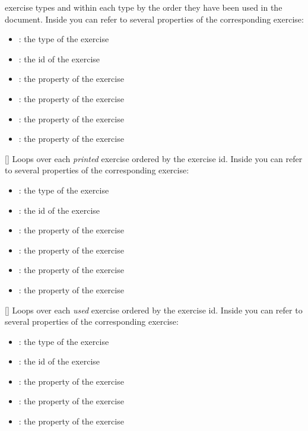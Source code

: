 \documentclass{xsim-manual}
\begin{document}
\begin{commands}
    exercise types and within each type by the order they have been used in
    the document.  Inside  you can refer to several properties of
    the corresponding exercise:
    \begin{itemize}
      \item {}: the type of the exercise
      \item {}: the id of the exercise
      \item {}: the  property of the exercise
      \item {}: the  property of the exercise
      \item {}: the  property of the exercise
      \item {}: the  property of the exercise
    \end{itemize}
  []
    Loops over each \emph{printed} exercise ordered by the exercise id.  Inside
     you can refer to several properties of the corresponding
    exercise:
    \begin{itemize}
      \item {}: the type of the exercise
      \item {}: the id of the exercise
      \item {}: the  property of the exercise
      \item {}: the  property of the exercise
      \item {}: the  property of the exercise
      \item {}: the  property of the exercise
    \end{itemize}
  []
    Loops over each \emph{used} exercise ordered by the exercise id.  Inside
     you can refer to several properties of the corresponding
    exercise:
    \begin{itemize}
      \item {}: the type of the exercise
      \item {}: the id of the exercise
      \item {}: the  property of the exercise
      \item {}: the  property of the exercise
      \item {}: the  property of the exercise

\end{itemize}
\end{commands}
\end{document}
